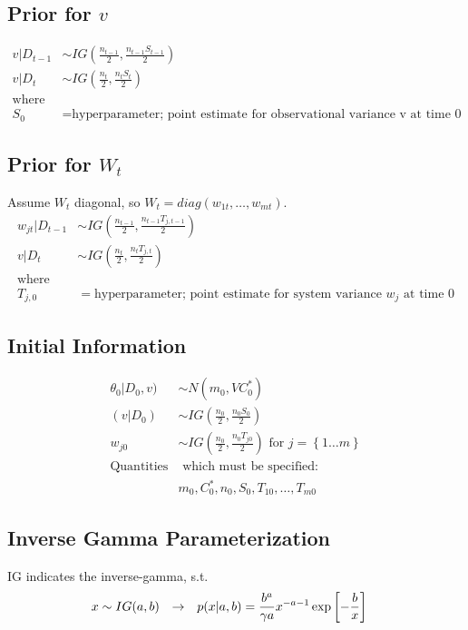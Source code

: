 \documentclass{article}
\newcommand{\myindent}{\hspace*{.25cm}}
\begin{document}
\subsection{Prior for $v$}
\begin{align*}
	v | D_{t-1} &\sim IG\left(\frac{n_{t-1}}{2},\frac{n_{t-1}S_{t-1}}{2} \right)\\
	v | D_{t} &\sim IG\left(\frac{n_{t}}{2},\frac{n_{t}S_{t}}{2} \right)\\
	\text{where}\\
	S_0 &= \text{hyperparameter; point estimate for observational variance v at time 0}
\end{align*}

\subsection{Prior for $W_t$}
Assume $W_t$ diagonal, so $W_t = diag\left(w_{1t},\hdots,w_{mt} \right)$.
\begin{align*}
	w_{jt} | D_{t-1} &\sim IG\left(\frac{n_{t-1}}{2},\frac{n_{t-1}T_{j,t-1}}{2} \right)\\
	v | D_{t} &\sim IG\left(\frac{n_{t}}{2},\frac{n_{t}T_{j,t}}{2} \right)\\
	\text{where}\\
	T_{j,0} &= \text{hyperparameter; point estimate for system variance } w_{j} \text{ at time 0}
\end{align*}

\subsection{Initial Information}
\begin{align*}
	\theta_0 | D_0,v) &\sim N(m_0,VC^*_0) \\
	(v | D_0) &\sim IG(\frac{n_0}{2},\frac{n_0S_0}{2}) \\
	w_{j0} &\sim IG(\frac{n_0}{2},\frac{n_0 T_{j0}}{2}) \text{ for }j = \left\{1 \hdots m \right\} \\
	\text{Quantities} & \text{ which must be specified:}\\
	&m_0,C^*_0,n_0,S_0,T_{10},\hdots,T_{m0}
\end{align*}

\subsection{Inverse Gamma Parameterization}
IG indicates the inverse-gamma, s.t. 
\begin{align*}
	x &\sim IG(a,b) \myindent \rightarrow \myindent 
		p(x|a,b) = \frac{b^a}{\gamma{a}} x^{-a-1}\exp\left[-\frac{b}{x} \right]
\end{align*}
\end{document}
